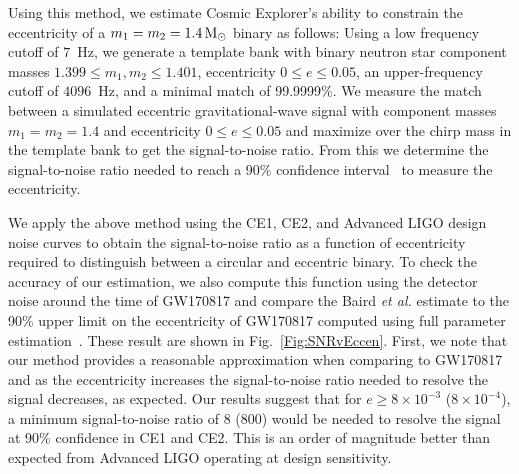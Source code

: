 Using this method, we estimate Cosmic Explorer's ability to constrain the eccentricity of a $m_1 = m_2 = 1.4\,\mathrm{M}_{\odot}$ binary as follows: Using a low frequency cutoff of $7$~Hz, we generate a template bank with binary neutron star component masses $1.399 \leq m_1,m_2 \leq 1.401$, eccentricity $0 \leq e \leq 0.05$, an upper-frequency cutoff of $4096$~Hz, and a minimal match of 99.9999\%. We measure the match between a simulated eccentric gravitational-wave signal with component masses $m_1 = m_2 = 1.4$ and eccentricity $0 \leq e \leq 0.05$ and maximize over the chirp mass in the template bank to get the signal-to-noise ratio. From this we determine the signal-to-noise ratio needed to reach a 90\% confidence interval~\cite{Baird:2012cu} to measure the eccentricity.

We apply the above method using the CE1, CE2, and Advanced LIGO design noise curves to obtain the signal-to-noise ratio as a function of eccentricity required to distinguish between a circular and eccentric binary. To check the accuracy of our estimation, we also compute this function using the detector noise around the time of GW170817 and compare the Baird {\it et al.} estimate to the 90\% upper limit on the eccentricity of GW170817 computed using full parameter estimation~\cite{Lenon:2020oza}. These result are shown in Fig.~\ref{Fig:SNRvEccen}. First, we note that our method provides a reasonable approximation when comparing to GW170817 and as the eccentricity increases the signal-to-noise ratio needed to resolve the signal decreases, as expected. Our results suggest that for $e \geq 8\times10^{-3}$ ($8\times 10^{-4}$), a minimum signal-to-noise ratio of 8 (800) would be needed to resolve the signal at 90\% confidence in CE1 and CE2. This is an order of magnitude better than expected from Advanced LIGO operating at design sensitivity.

